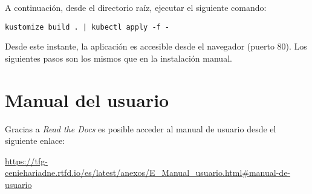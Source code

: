 A continuación, desde el directorio raíz, ejecutar el
siguiente comando:

\begin{verbatim}
kustomize build . | kubectl apply -f -
\end{verbatim}

Desde este instante, la aplicación es accesible desde el navegador
(puerto 80). Los siguientes pasos son los mismos que en la instalación manual.


\section{Manual del usuario}

Gracias a \emph{Read the Docs} es posible acceder al manual de usuario desde el siguiente enlace:

\begin{mdframed}[outerlinecolor=red,outerlinewidth=2pt,linecolor=mucolor,middlelinewidth=3pt,roundcorner=10pt,nobreak=true]
  \begin{center}
    \url{https://tfg-ceniehariadne.rtfd.io/es/latest/anexos/E_Manual_usuario.html#manual-de-usuario}
  \end{center}
\end{mdframed}





